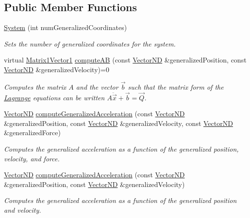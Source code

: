 \subsection*{Public Member Functions}
\begin{DoxyCompactItemize}
\item 
\hyperlink{class_system_a529efa4e15e9494ff4da5711e1d090d8}{System} (int num\-Generalized\-Coordinates)
\begin{DoxyCompactList}\small\item\em Sets the number of generalized coordinates for the system. \end{DoxyCompactList}\item 
virtual \hyperlink{struct_matrix1_vector1}{Matrix1\-Vector1} \hyperlink{class_system_adecf99535be960c23a8bb44de97cbb21}{compute\-A\-B} (const \hyperlink{class_vector_n_d}{Vector\-N\-D} \&generalized\-Position, const \hyperlink{class_vector_n_d}{Vector\-N\-D} \&generalized\-Velocity)=0
\begin{DoxyCompactList}\small\item\em Computes the matrix $A$ and the vector $\overrightarrow{b}$ such that the matrix form of the \hyperlink{namespace_lagrange}{Lagrange} equations can be written $ A \ddot{\overrightarrow{x}} + \overrightarrow{b} = \overrightarrow{Q} $. \end{DoxyCompactList}\item 
\hyperlink{class_vector_n_d}{Vector\-N\-D} \hyperlink{class_system_a785142b18417fc36453c4e72695a4f81}{compute\-Generalized\-Acceleration} (const \hyperlink{class_vector_n_d}{Vector\-N\-D} \&generalized\-Position, const \hyperlink{class_vector_n_d}{Vector\-N\-D} \&generalized\-Velocity, const \hyperlink{class_vector_n_d}{Vector\-N\-D} \&generalized\-Force)
\begin{DoxyCompactList}\small\item\em Computes the generalized acceleration as a function of the generalized position, velocity, and force. \end{DoxyCompactList}\item 
\hyperlink{class_vector_n_d}{Vector\-N\-D} \hyperlink{class_system_a61e4343973cce9211e65217379dcb1d1}{compute\-Generalized\-Acceleration} (const \hyperlink{class_vector_n_d}{Vector\-N\-D} \&generalized\-Position, const \hyperlink{class_vector_n_d}{Vector\-N\-D} \&generalized\-Velocity)
\begin{DoxyCompactList}\small\item\em Computes the generalized acceleration as a function of the generalized position and velocity. \end{DoxyCompactList}\end{DoxyCompactItemize}
